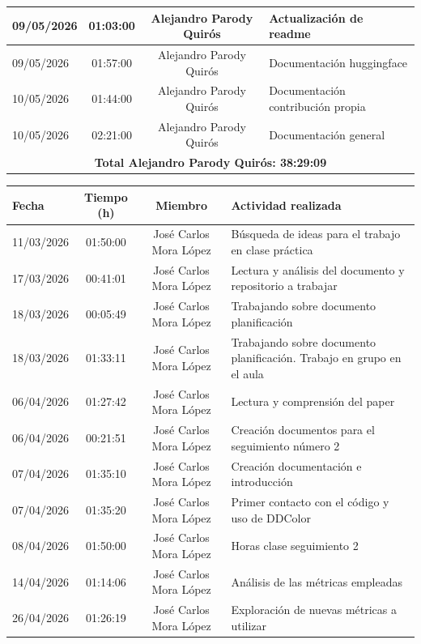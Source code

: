\documentclass[a4paper]{article}
\begin{document}
\begin{center}
\begin{tabular}{|p{3.5cm}|c|c|p{6cm}|}
09/05/2026 & 01:03:00 & Alejandro Parody Quirós & Actualización de readme \\\hline
09/05/2026 & 01:57:00 & Alejandro Parody Quirós & Documentación huggingface \\\hline
10/05/2026 & 01:44:00 & Alejandro Parody Quirós & Documentación contribución propia \\\hline
10/05/2026 & 02:21:00 & Alejandro Parody Quirós & Documentación general \\\hline
\multicolumn{4}{|c|}{\textbf{Total Alejandro Parody Quirós: 38:29:09}} \\\hline
\end{tabular}
\end{center}

\bigskip

\begin{center}
\begin{tabular}{|p{3.5cm}|c|c|p{6cm}|}
\hline
\textbf{Fecha} & \textbf{Tiempo (h)} & \textbf{Miembro} & \textbf{Actividad realizada} \\\hline
11/03/2026 & 01:50:00 & José Carlos Mora López & Búsqueda de ideas para el trabajo en clase práctica \\\hline
17/03/2026 & 00:41:01 & José Carlos Mora López & Lectura y análisis del documento y repositorio a trabajar \\\hline
18/03/2026 & 00:05:49 & José Carlos Mora López & Trabajando sobre documento planificación \\\hline
18/03/2026 & 01:33:11 & José Carlos Mora López & Trabajando sobre documento planificación. Trabajo en grupo en el aula \\\hline
06/04/2026 & 01:27:42 & José Carlos Mora López & Lectura y comprensión del paper \\\hline
06/04/2026 & 00:21:51 & José Carlos Mora López & Creación documentos para el seguimiento número 2 \\\hline
07/04/2026 & 01:35:10 & José Carlos Mora López & Creación documentación e introducción \\\hline
07/04/2026 & 01:35:20 & José Carlos Mora López & Primer contacto con el código y uso de DDColor \\\hline
08/04/2026 & 01:50:00 & José Carlos Mora López & Horas clase seguimiento 2 \\\hline
14/04/2026 & 01:14:06 & José Carlos Mora López & Análisis de las métricas empleadas \\\hline
26/04/2026 & 01:26:19 & José Carlos Mora López & Exploración de nuevas métricas a utilizar \\\hline

\end{tabular}
\end{center}
\end{document}
